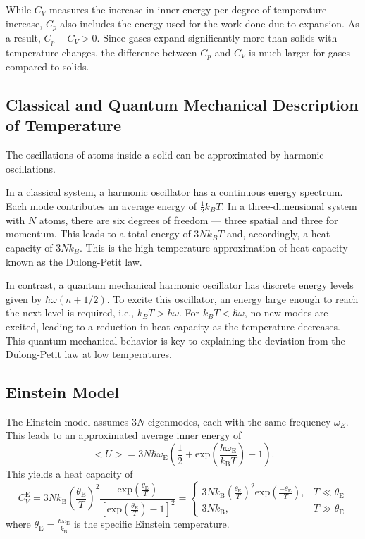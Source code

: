 While $C_V$ measures the increase in inner energy per degree of 
temperature increase, $C_p$ also includes the energy used for the work 
done due to expansion. As a result, $C_p-C_V>0$. Since gases expand 
significantly more than solids with temperature changes, the difference between 
$C_p$ and $C_V$ is much larger for gases compared to solids.

\subsection{Classical and Quantum Mechanical Description of Temperature}
The oscillations of atoms inside a solid can be approximated by 
harmonic oscillations. 

In a classical system, a harmonic oscillator has a continuous energy spectrum.
Each mode contributes an average energy of $\frac{1}{2}k_BT$. 
In a three-dimensional system with $N$ atoms, 
there are six degrees of freedom — three spatial and three for momentum.
This leads to a total energy of $3Nk_BT$ and, accordingly, 
a heat capacity of $3Nk_B$. 
This is the high-temperature approximation of heat capacity known as the Dulong-Petit law.

In contrast, a quantum mechanical harmonic oscillator has discrete energy levels 
given by $\hbar\omega(n+1/2)$. To excite this oscillator, an energy 
large enough to reach the next level is required, i.e., $k_BT>\hbar\omega$.
For $k_BT<\hbar\omega$, no new modes are excited, leading to a reduction in heat capacity 
as the temperature decreases. This quantum mechanical behavior is key to explaining 
the deviation from the Dulong-Petit law at low temperatures.

\subsection{Einstein Model}
The Einstein model assumes $3N$ eigenmodes, each with the same frequency $\omega_E$.
This leads to an approximated average inner energy of 
\begin{equation}
    \bigl<U\bigr> = 3N \hbar\omega_\text{E} \left(\frac{1}{2} + \text{exp}\left(\frac{\hbar \omega_\text{E}}{k_\text{B}T}\right)
     - 1\right) .
\end{equation}
This yields a heat capacity of 
\begin{equation}
    C_V^\text{E} = 3Nk_\text{B} \left(\frac{\theta_\text{E}}{T}\right)^2 \frac{\text{exp}\left(\frac{\theta_\text{E}}{T}\right)}
    {\left[\text{exp}\left(\frac{\theta_\text{E}}{T}\right) - 1\right]^2} = 
    \begin{cases}
        3Nk_\text{B} \left(\frac{\theta_\text{E}}{T}\right)^2 \text{exp}\left(\frac{-\theta_\text{E}}{T}\right), 
        & T \ll \theta_\text{E} \\
        3Nk_\text{B} , & T \gg \theta_\text{E}
    \end{cases}
\end{equation}
where $\theta_\text{E} = \frac{\hbar\omega_\text{E}}{k_\text{B}}$ is the specific 
Einstein temperature.

